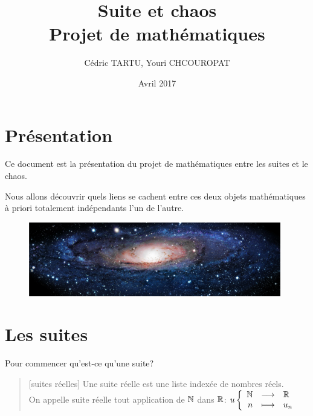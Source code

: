 \documentclass[french,11pt]{report}
\author{Cédric TARTU, Youri CHCOUROPAT}
\title{Suite et chaos \\ Projet de mathématiques}
\date{Avril 2017}
\begin{document}
\maketitle
\tableofcontents

\chapter*{Présentation}

Ce document est la présentation du projet de mathématiques entre les suites et le chaos. 

Nous allons découvrir quels liens se cachent entre ces deux objets mathématiques à priori totalement indépendants l'un de l'autre.

\vspace*{60mm}

\begin{figure} [!h]
    \centering
    \includegraphics[width=11cm]{trou_noir}
    \label{fig:trou_noir}
\end{figure}


\chapter{Les suites}


Pour commencer qu'est-ce qu'une suite?

\begin{quote}[suites réelles]
  Une suite réelle est une liste indexée de nombres réels. \\
  On appelle suite réelle tout application de $\mathbb{N}$ dans $\mathbb{R}$: 
  $
  u
  \left\{
  \begin{array}{rcl}
    \mathbb{N}  & \longrightarrow  	& \mathbb{R} \\
    n  	& \longmapsto   	& u_n \\
  \end{array}
  \right.
  $\\
\end{quote}
\end{document}
